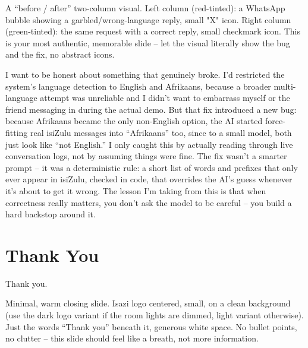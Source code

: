 \documentclass[11pt]{article}
\begin{document}
\begin{visual}
A ``before / after'' two-column visual. Left column (red-tinted): a WhatsApp bubble
showing a garbled/wrong-language reply, small "X" icon. Right column (green-tinted):
the same request with a correct reply, small checkmark icon. This is your most authentic,
memorable slide -- let the visual literally show the bug and the fix, no abstract icons.
\end{visual}

\begin{scriptbox}
I want to be honest about something that genuinely broke. I'd restricted the system's
language detection to English and Afrikaans, because a broader multi-language attempt
was unreliable and I didn't want to embarrass myself or the friend messaging in
during the actual demo. But that fix introduced a new bug: because Afrikaans became the
only non-English option, the AI started force-fitting real isiZulu messages into
``Afrikaans'' too, since to a small model, both just look like ``not English.'' I only
caught this by actually reading through live conversation logs, not by assuming things
were fine. The fix wasn't a smarter prompt -- it was a deterministic rule: a short list
of words and prefixes that only ever appear in isiZulu, checked in code, that overrides
the AI's guess whenever it's about to get it wrong. The lesson I'm taking from this is
that when correctness really matters, you don't ask the model to be careful -- you build
a hard backstop around it.
\end{scriptbox}

\section{Thank You}

\begin{onslide}
Thank you.
\end{onslide}

\begin{visual}
Minimal, warm closing slide. Isazi logo centered, small, on a clean background (use the
dark logo variant if the room lights are dimmed, light variant otherwise). Just the
words ``Thank you'' beneath it, generous white space. No bullet points, no clutter --
this slide should feel like a breath, not more information.
\end{visual}
\end{document}

